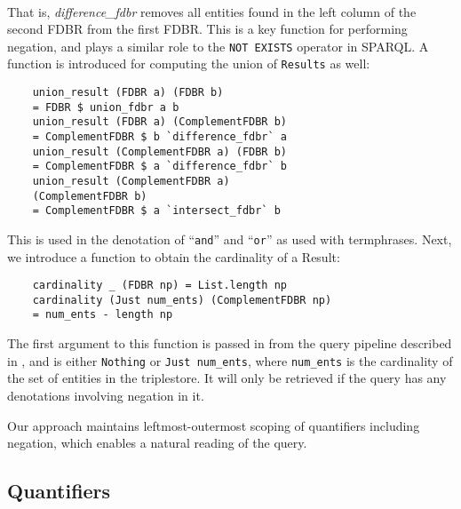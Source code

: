\documentclass[../main.tex]{subfiles}
\begin{document}
\begin{refsection}
\begin{multline*}
\end{multline*}
That is, \textit{difference\_fdbr} removes all entities found in the left column of the second FDBR from the first FDBR.  This is a key function for performing negation, and plays a similar role to the \texttt{NOT EXISTS} operator in SPARQL.  A function is introduced for computing the union of \texttt{Results} as well:
\begin{small}
	\begin{verbatim}
    union_result (FDBR a) (FDBR b)
    = FDBR $ union_fdbr a b
    union_result (FDBR a) (ComplementFDBR b)
    = ComplementFDBR $ b `difference_fdbr` a
    union_result (ComplementFDBR a) (FDBR b)
    = ComplementFDBR $ a `difference_fdbr` b
    union_result (ComplementFDBR a)
    (ComplementFDBR b)
    = ComplementFDBR $ a `intersect_fdbr` b
	\end{verbatim}
\end{small}
This is used in the denotation of ``\texttt{and}'' and ``\texttt{or}'' as used with termphrases.
Next, we introduce a function to obtain the cardinality of a Result:
\begin{small}
	\begin{verbatim}
    cardinality _ (FDBR np) = List.length np
    cardinality (Just num_ents) (ComplementFDBR np)
    = num_ents - length np
	\end{verbatim}
\end{small}

The first argument to this function is passed in from the query pipeline described in \cite{peelar2020webistjournal}, and is either \texttt{Nothing} or \texttt{Just num\_ents}, where
\texttt{num\_ents} is the cardinality of the set of entities in the triplestore.  It will only be retrieved if the query has any denotations involving negation in it.

Our approach maintains leftmost-outermost scoping of quantifiers including negation, which enables a natural reading of the query.

\subsection{Quantifiers}
\label{subsec:quantifiers}


\end{refsection}
\end{document}
